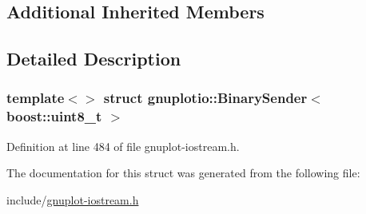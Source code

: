 \subsection*{Additional Inherited Members}


\subsection{Detailed Description}
\subsubsection*{template$<$$>$\newline
struct gnuplotio\+::\+Binary\+Sender$<$ boost\+::uint8\+\_\+t $>$}



Definition at line 484 of file gnuplot-\/iostream.\+h.



The documentation for this struct was generated from the following file\+:\begin{DoxyCompactItemize}
\item 
include/\hyperlink{gnuplot-iostream_8h}{gnuplot-\/iostream.\+h}\end{DoxyCompactItemize}
